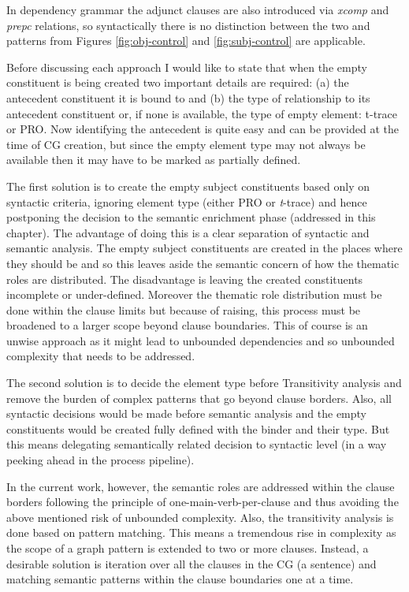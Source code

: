     In dependency grammar the adjunct clauses are also introduced via \textit{xcomp} and \textit{prepc} relations, so syntactically there is no distinction between the two and patterns from Figures \ref{fig:obj-control} and \ref{fig:subj-control} are applicable.


    Before discussing each approach I would like to state that when the empty constituent is being created two important details are required: (a) the antecedent constituent it is bound to and (b) the type of relationship to its antecedent constituent or, if none is available, the type of empty element: t-trace or PRO. Now identifying the antecedent is quite easy and can be provided at the time of CG creation, but since the empty element type may not always be available then it may have to be marked as partially defined.

    The first solution is to create the empty subject constituents based only on syntactic criteria, ignoring element type (either PRO or \textit{t}-trace) and hence postponing the decision to the semantic enrichment phase (addressed in this chapter). The advantage of doing this is a clear separation of syntactic and semantic analysis. The empty subject constituents are created in the places where they should be and so this leaves aside the semantic concern of how the thematic roles are distributed. The disadvantage is leaving the created constituents incomplete or under-defined. Moreover the thematic role distribution must be done within the clause limits but because of raising, this process must be broadened to a larger scope beyond clause boundaries. This of course is an unwise approach as it might lead to unbounded dependencies and so unbounded complexity that needs to be addressed. 

    The second solution is to decide the element type before Transitivity analysis and remove the burden of complex patterns that go beyond clause borders. Also, all syntactic decisions would be made before semantic analysis and the empty constituents would be created fully defined with the binder and their type. But this means delegating semantically related decision to syntactic level (in a way peeking ahead in the process pipeline).

    In the current work, however, the semantic roles are addressed within the clause borders following the principle of one-main-verb-per-clause and thus avoiding the above mentioned risk of unbounded complexity. Also, the transitivity analysis is done based on pattern matching. This means a tremendous rise in complexity as the scope of a graph pattern is extended to two or more clauses. Instead, a desirable solution is iteration over all the clauses in the CG (a sentence) and matching semantic patterns within the clause boundaries one at a time.

